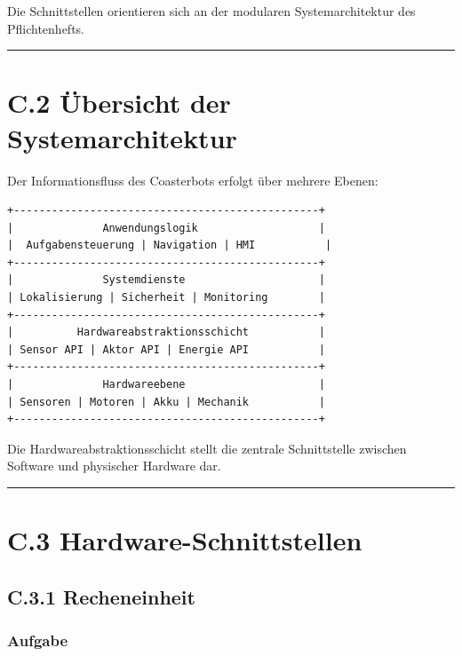 \documentclass[
]{article}
\begin{document}
Die Schnittstellen orientieren sich an der modularen Systemarchitektur
des Pflichtenhefts.

\begin{center}\rule{0.5\linewidth}{0.5pt}\end{center}

\section{C.2 Übersicht der
Systemarchitektur}\label{c.2-uxfcbersicht-der-systemarchitektur}

Der Informationsfluss des Coasterbots erfolgt über mehrere Ebenen:

\begin{verbatim}
+------------------------------------------------+
|              Anwendungslogik                   |
|  Aufgabensteuerung | Navigation | HMI           |
+------------------------------------------------+
|              Systemdienste                     |
| Lokalisierung | Sicherheit | Monitoring        |
+------------------------------------------------+
|          Hardwareabstraktionsschicht           |
| Sensor API | Aktor API | Energie API           |
+------------------------------------------------+
|              Hardwareebene                     |
| Sensoren | Motoren | Akku | Mechanik           |
+------------------------------------------------+
\end{verbatim}

Die Hardwareabstraktionsschicht stellt die zentrale Schnittstelle
zwischen Software und physischer Hardware dar.

\begin{center}\rule{0.5\linewidth}{0.5pt}\end{center}

\section{C.3 Hardware-Schnittstellen}\label{c.3-hardware-schnittstellen}

\subsection{C.3.1 Recheneinheit}\label{c.3.1-recheneinheit}

\subsubsection{Aufgabe}\label{aufgabe-12}
\end{document}
